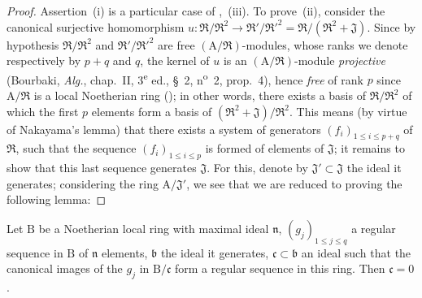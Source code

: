 \begin{proof}
Assertion~(i) is a particular case of ,~(iii).
To prove~(ii), consider the canonical surjective homomorphism $u:\mathfrak{R}/\mathfrak{R}^2\to\mathfrak{R}'/\mathfrak{R}'^2=\mathfrak{R}/(\mathfrak{R}^2+\mathfrak{J})$.
Since by hypothesis $\mathfrak{R}/\mathfrak{R}^2$ and $\mathfrak{R}'/\mathfrak{R}'^2$ are free $(\mathrm{A}/\mathfrak{R})$-modules, whose ranks we denote respectively by $p+q$ and $q$, the kernel of $u$ is an $(\mathrm{A}/\mathfrak{R})$-module \emph{projective} (Bourbaki, \emph{Alg.}, chap.~II, 3\textsuperscript{e} ed., \S~2, n\textsuperscript{o}~2, prop.~4), hence \emph{free} of rank $p$ since $\mathrm{A}/\mathfrak{R}$ is a local Noetherian ring (); in other words, there exists a basis of $\mathfrak{R}/\mathfrak{R}^2$ of which the first $p$ elements form a basis of $(\mathfrak{R}^2+\mathfrak{J})/\mathfrak{R}^2$.
This means (by virtue of Nakayama's lemma) that there exists a system of generators $(f_i)_{1\leq i\leq p+q}$ of $\mathfrak{R}$, such that the sequence $(f_i)_{1\leq i\leq p}$ is formed of elements of $\mathfrak{J}$; it remains to show that this last sequence generates $\mathfrak{J}$.
For this, denote by $\mathfrak{J}'\subset\mathfrak{J}$ the ideal it generates; considering the ring $\mathrm{A}/\mathfrak{J}'$, we see that we are reduced to proving the following lemma:
\end{proof}

\begin{lemma}[19.1.6.1]
\label{IV.19.1.6.1}
Let $\mathrm{B}$ be a Noetherian local ring with maximal ideal $\mathfrak{n}$, $(g_j)_{1\leq j\leq q}$ a regular sequence in $\mathrm{B}$ of $\mathfrak{n}$ elements, $\mathfrak{b}$ the ideal it generates, $\mathfrak{c}\subset\mathfrak{b}$ an ideal such that the canonical images of the $g_j$ in $\mathrm{B}/\mathfrak{c}$ form a regular sequence in this ring.
Then $\mathfrak{c}=0$.
\end{lemma}

